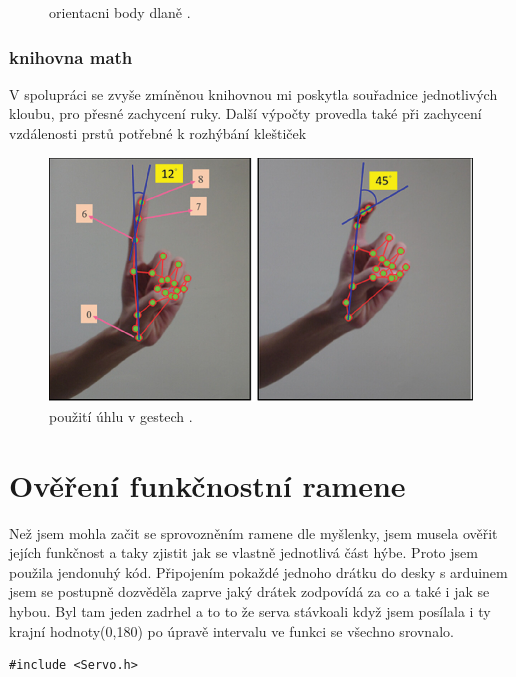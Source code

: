 \documentclass[12pt, a4paper,
twoside,        %
openright
]{report}
\begin{document}
{\begin{figure}[h]
	
	\caption{orientacni body dlaně \cite{orientacni body dlaně}.} %
	\label{fig:obvod} %
\end{figure}

\subsubsection{knihovna math}

V spolupráci se zvyše zmíněnou knihovnou mi poskytla souřadnice jednotlivých kloubu, pro přesné zachycení ruky. 
Další výpočty provedla také při zachycení vzdálenosti prstů potřebné k rozhýbání kleštiček

\begin{figure}[h]
	
	\centering
	\includegraphics[width=0.8\linewidth]{image/prikladGesta.PNG} 
	
	
	\caption{použití úhlu v gestech \cite{uhly v gestech}.} %
	\label{fig:uhlyVGestech} %
\end{figure}

\newpage


\section{Ověření funkčnostní ramene}
Než jsem mohla začit se sprovozněním ramene dle myšlenky, jsem musela ověřit jejích funkčnost a taky zjistit jak se vlastně jednotlivá část hýbe.
Proto jsem použila jendonuhý kód. Připojením pokaždé jednoho drátku do desky s arduinem jsem se postupně dozvěděla zaprve jaký drátek zodpovídá za co a také i jak se hybou. Byl tam jeden zadrhel a to to že serva stávkoali když jsem posílala i ty krajní hodnoty(0,180) po úpravě intervalu ve funkci se všechno srovnalo.

\begin{lstlisting}[style=Python, caption={Ukázka kódu k ověření funkčnosti}]
#include <Servo.h>


\end{lstlisting}}
\end{document}
